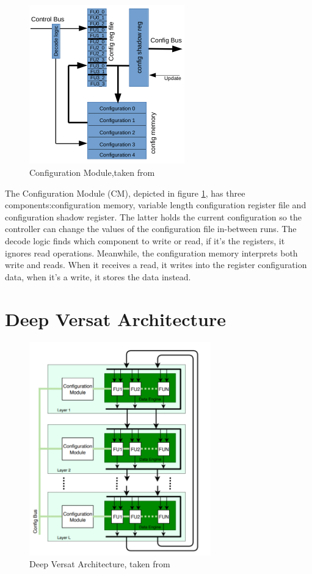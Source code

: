 \begin{figure}[!htbp]
    \centering
    \includegraphics[width=0.6\textwidth]{Figures/conf.png}
    \caption{Configuration Module,taken from~\cite{sousa:controller}}
    \label{figure:conf}
\end{figure} 

The Configuration Module (CM), depicted in figure \ref{figure:conf}, 
has three components:configuration memory, variable length configuration register file 
and configuration shadow register.
The latter holds the current configuration so the controller can change the values of the configuration file in-between runs.
The decode logic finds which component to write or read, if it's the registers, it ignores read operations.
Meanwhile, the configuration memory interprets both write and reads. When it receives a read,
it writes into the register configuration data, when it's a write, it stores the data instead.


\newpage
\section{Deep Versat Architecture}


\begin{figure}[!htb]
    \centering
    \includegraphics[width=0.7\textwidth]{Figures/deep-versat.png}
    \caption{Deep Versat Architecture, taken from~\cite{valter:deepversat}}
    \label{figure:deepversatarch}
\end{figure} 


